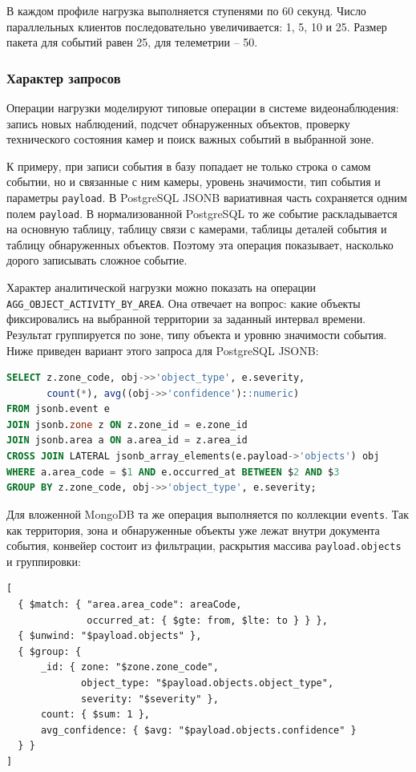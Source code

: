 В каждом профиле нагрузка выполняется ступенями по 60 секунд. Число
параллельных клиентов последовательно увеличивается: 1, 5, 10 и 25.
Размер пакета для событий равен 25, для телеметрии -- 50.

\subsubsection{Характер запросов}

Операции нагрузки моделируют типовые операции в системе видеонаблюдения: запись
новых наблюдений, подсчет обнаруженных объектов, проверку технического
состояния камер и поиск важных событий в выбранной зоне.

К примеру, при записи события в базу попадает не только строка о самом событии, но и
связанные с ним камеры, уровень значимости, тип события и параметры
\texttt{payload}. В PostgreSQL JSONB вариативная часть сохраняется одним
полем \texttt{payload}. В нормализованной PostgreSQL то же событие
раскладывается на основную таблицу, таблицу связи с камерами, таблицы деталей
события и таблицу обнаруженных объектов. Поэтому эта операция показывает,
насколько дорого записывать сложное событие.

Характер аналитической нагрузки можно показать на операции
\texttt{AGG\_OBJECT\_ACTIVITY\_BY\_AREA}. Она отвечает на вопрос: какие
объекты фиксировались на выбранной территории за заданный интервал времени.
Результат группируется по зоне, типу объекта и уровню значимости события.
Ниже приведен вариант этого запроса для PostgreSQL JSONB:

\begin{lstlisting}[language=SQL, basicstyle=\ttfamily\small]
SELECT z.zone_code, obj->>'object_type', e.severity,
       count(*), avg((obj->>'confidence')::numeric)
FROM jsonb.event e
JOIN jsonb.zone z ON z.zone_id = e.zone_id
JOIN jsonb.area a ON a.area_id = z.area_id
CROSS JOIN LATERAL jsonb_array_elements(e.payload->'objects') obj
WHERE a.area_code = $1 AND e.occurred_at BETWEEN $2 AND $3
GROUP BY z.zone_code, obj->>'object_type', e.severity;
\end{lstlisting}

Для вложенной MongoDB та же операция выполняется по коллекции
\texttt{events}. Так как территория, зона и обнаруженные объекты уже лежат
внутри документа события, конвейер состоит из фильтрации, раскрытия массива
\texttt{payload.objects} и группировки:

\begin{lstlisting}[basicstyle=\ttfamily\small]
[
  { $match: { "area.area_code": areaCode,
              occurred_at: { $gte: from, $lte: to } } },
  { $unwind: "$payload.objects" },
  { $group: {
      _id: { zone: "$zone.zone_code",
             object_type: "$payload.objects.object_type",
             severity: "$severity" },
      count: { $sum: 1 },
      avg_confidence: { $avg: "$payload.objects.confidence" }
  } }
]
\end{lstlisting}

